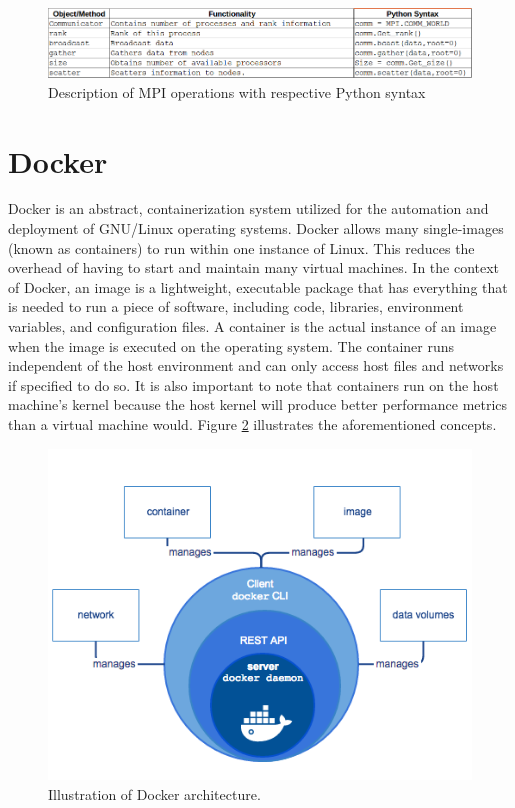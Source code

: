 \\

\begin{figure}
\centering
\includegraphics[scale=0.5]{Figures/table-syntax}
\decoRule
\caption[MPI Table]{Description of MPI operations with respective Python syntax}
\label{fig:MPI Table}
\end{figure}


\section{Docker}

Docker is an abstract, containerization system utilized for the automation and deployment of GNU/Linux operating systems.  Docker allows many single-images (known as containers) to run within one instance of Linux. This reduces the overhead of having to start and maintain many virtual machines.
    In the context of Docker, an image is a lightweight, executable package that has everything that is needed to run a piece of software, including code, libraries, environment variables, and configuration files. A container is the actual instance of an image when the image is executed on the operating system. The container runs independent of the host environment and can only access host files and networks if specified to do so. It is also important to note that containers run on the host machine’s kernel because the host kernel will produce better performance metrics than a virtual machine would. Figure \ref{fig:Docker Architecture} illustrates the aforementioned concepts.

\begin{figure}
\centering
\includegraphics[scale=0.8]{Figures/docker-diagram}
\decoRule
\caption[Docker Architecture]{Illustration of Docker architecture.}
\label{fig:Docker Architecture}
\end{figure}

